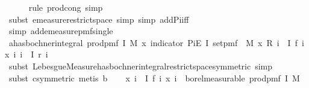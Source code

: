 \begin{isabellebody}
\ \ \ \ \isamarkupfalse%
\ {\isacharparenleft}{\kern0pt}rule\ prod{\isachardot}{\kern0pt}cong{\isacharcomma}{\kern0pt}\ simp{\isacharparenright}{\kern0pt}\isanewline
\ \ \ \ \isamarkupfalse%
\ {\isacharparenleft}{\kern0pt}subst\ emeasure{\isacharunderscore}{\kern0pt}restrict{\isacharunderscore}{\kern0pt}space{\isacharcomma}{\kern0pt}\ simp{\isacharcomma}{\kern0pt}\ simp\ add{\isacharcolon}{\kern0pt}Pi{\isacharunderscore}{\kern0pt}iff{\isacharparenright}{\kern0pt}\isanewline
\ \ \ \ \isamarkupfalse%
\ {\isacharparenleft}{\kern0pt}simp\ add{\isacharcolon}{\kern0pt}emeasure{\isacharunderscore}{\kern0pt}pmf{\isacharunderscore}{\kern0pt}single{\isacharparenright}{\kern0pt}\isanewline
\isanewline
\ \ \isamarkupfalse%
\ a{\isacharcolon}{\kern0pt}{\isachardoublequoteopen}has{\isacharunderscore}{\kern0pt}bochner{\isacharunderscore}{\kern0pt}integral\ {\isacharparenleft}{\kern0pt}prod{\isacharunderscore}{\kern0pt}pmf\ I\ M{\isacharparenright}{\kern0pt}\ {\isacharparenleft}{\kern0pt}{\isasymlambda}x{\isachardot}{\kern0pt}\ indicator\ {\isacharparenleft}{\kern0pt}PiE\ I\ {\isacharparenleft}{\kern0pt}set{\isacharunderscore}{\kern0pt}pmf\ {\isasymcirc}\ M{\isacharparenright}{\kern0pt}{\isacharparenright}{\kern0pt}\ x\ {\isacharasterisk}{\kern0pt}\isactrlsub R\ {\isacharparenleft}{\kern0pt}{\isasymProd}i\ {\isasymin}\ I{\isachardot}{\kern0pt}\ f\ i\ {\isacharparenleft}{\kern0pt}x\ i{\isacharparenright}{\kern0pt}{\isacharparenright}{\kern0pt}{\isacharparenright}{\kern0pt}\ {\isacharparenleft}{\kern0pt}{\isasymProd}i\ {\isasymin}\ I{\isachardot}{\kern0pt}\ r\ i{\isacharparenright}{\kern0pt}{\isachardoublequoteclose}\isanewline
\ \ \ \ \isamarkupfalse%
\ {\isacharparenleft}{\kern0pt}subst\ Lebesgue{\isacharunderscore}{\kern0pt}Measure{\isachardot}{\kern0pt}has{\isacharunderscore}{\kern0pt}bochner{\isacharunderscore}{\kern0pt}integral{\isacharunderscore}{\kern0pt}restrict{\isacharunderscore}{\kern0pt}space{\isacharbrackleft}{\kern0pt}symmetric{\isacharbrackright}{\kern0pt}{\isacharcomma}{\kern0pt}\ simp{\isacharparenright}{\kern0pt}\isanewline
\ \ \ \ \isamarkupfalse%
\ {\isacharparenleft}{\kern0pt}subst\ c{\isacharbrackleft}{\kern0pt}symmetric{\isacharbrackright}{\kern0pt}{\isacharcomma}{\kern0pt}\ metis\ b{\isacharparenright}{\kern0pt}\isanewline
\isanewline
\ \ \isamarkupfalse%
\ {\isachardoublequoteopen}{\isacharparenleft}{\kern0pt}{\isasymlambda}x{\isachardot}{\kern0pt}\ {\isasymProd}i\ {\isasymin}\ I{\isachardot}{\kern0pt}\ f\ i\ {\isacharparenleft}{\kern0pt}x\ i{\isacharparenright}{\kern0pt}{\isacharparenright}{\kern0pt}\ {\isasymin}\ borel{\isacharunderscore}{\kern0pt}measurable\ {\isacharparenleft}{\kern0pt}prod{\isacharunderscore}{\kern0pt}pmf\ I\ M{\isacharparenright}{\kern0pt}{\isachardoublequoteclose}\isanewline

\end{isabellebody}
